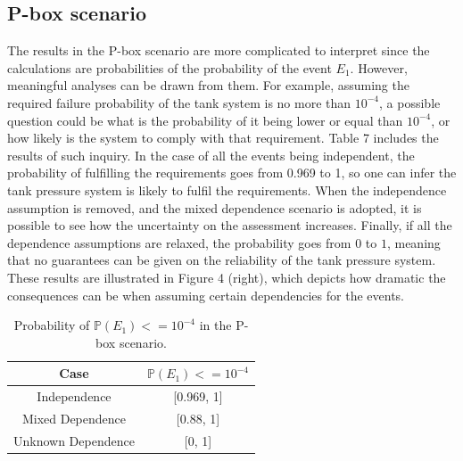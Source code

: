 \documentclass[runningheads]{llncs}
\begin{document}
\subsection{P-box scenario}

The results in the P-box scenario are more complicated to interpret since the calculations are probabilities of the probability of the event $E_1$.
However, meaningful analyses can be drawn from them.
For example, assuming the required failure probability of the tank system is no more than $10^{-4}$, a possible question could be what is the probability of it being lower or equal than $10^{-4}$, or how likely is the system to comply with that requirement.
Table 7 includes the results of such inquiry.
In the case of all the events being independent, the probability of fulfilling the requirements goes from 0.969 to 1, so one can infer the tank pressure system is likely to fulfil the requirements.
When the independence assumption is removed, and the mixed dependence scenario is adopted, it is possible to see how the uncertainty on the assessment increases.
Finally, if all the dependence assumptions are relaxed, the probability goes from $0$ to $1$, meaning that no guarantees can be given on the reliability of the tank pressure system.
These results are illustrated in Figure 4 (right), which depicts how dramatic the consequences can be when assuming certain dependencies for the events.

\begin{table}[!th]
\centering
\caption{Probability of $\mathbb{P}(E_1) <= 10^{-4}$ in the P-box scenario.}\label{tab1}
\begin{tabular}{|c|c|}
\hline
Case               & $\mathbb{P}(E_1) <= 10^{-4}$ \\ \hline
Independence       & {[}0.969, 1{]}    \\ \hline
Mixed Dependence   & {[}0.88, 1{]}     \\ \hline
Unknown Dependence & {[}0, 1{]}        \\ \hline
\end{tabular}
\end{table}

%
\end{document}
